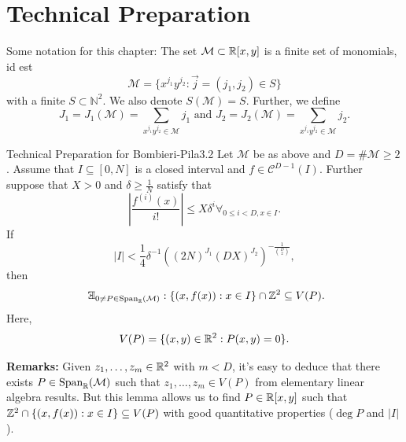 \documentclass{Vorlesungstemplate_English} %
\newcommand{\Nzero}{\mathbb{N}}
\begin{document}
\section{Technical Preparation}
Some notation for this chapter: The set $\mathcal{M} \subset \mathbb{R}[x,y]$ is a finite set of monomials, id est
\[ \mathcal{M} = \{ x^{j_1}y^{j_2}: \vec j = (j_1, j_2) \in S\}\]
with a finite $S \subset \Nzero^2$. We also denote $S(\mathcal{M}) = S$. Further, we define
\[ J_1 = J_1(\mathcal{M}) = \sum_{x^{j_1}y^{j_2} \in \mathcal{M}} j_1 \text{ and } J_2 = J_2(\mathcal{M}) = \sum_{x^{j_1}y^{j_2} \in \mathcal{M}} j_2.\]
\begin{lemma}{Technical Preparation for Bombieri-Pila}{3.2}
  Let $\mathcal{M}$ be as above and $D = \#\mathcal{M} \geq 2$. Assume that $I \subseteq [0,N]$ is a closed interval and $f \in \mathcal{C}^{D-1}(I)$. Further suppose that $X > 0$ and $\delta \geq \frac{1}{N}$ satisfy that
  \[ \left| \frac{f^{(i)}(x)}{i!}\right| \leq X\delta^i \forall_{0 \leq i < D, x \in I}.\]
  If
  \[ |I| < \frac{1}{4}\delta^{-1}\left((2N)^{J_1}(DX)^{J_2}\right)^{-\frac{1}{\binom{D}{2}}},\]
  then
   \[\exists_{0 \neq P \in \Span_{\R}(\mathcal{M})}:\{ (x,f(x)): x \in I\} \cap \Z^2 \subseteq V(P).\]
  Here,
  \[ V(P)= \{ (x,y) \in \mathbb{R}^2: P(x,y) = 0\}.\]
\end{lemma}
\noindent \textbf{Remarks:} Given $z_1, \dots, z_m \in \mathbb{R}^2$ with $m < D$, it's easy to deduce that there exists $P \in \text{Span}_{\mathbb{R}}(\mathcal{M})$ such that $z_1, \dots, z_m \in V(P)$ from elementary linear algebra results. But this lemma allows us to find $P \in \mathbb{R}[x,y]$ such that $\mathbb{Z}^2 \cap \{ (x,f(x)): x \in I\} \subseteq V(P)$ with good quantitative properties ($\deg P$ and $|I|$).
\end{document}
